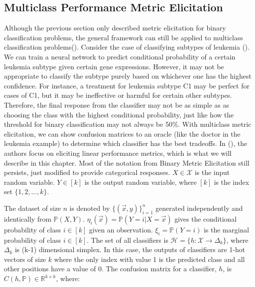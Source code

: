 \documentclass[
  letterpaper,
  numbers=noenddot,
  DIV=11]{scrreprt}
\theoremstyle{plain}
\theoremstyle{definition}
\theoremstyle{remark}
\begin{document}
\subsection{Multiclass Performance Metric
Elicitation}\label{multiclass-performance-metric-elicitation}

Although the previous section only described metric elicitation for
binary classification problems, the general framework can still be
applied to multiclass classification
problems().
Consider the case of classifying subtypes of leukemia
(). We can
train a neural network to predict conditional probability of a certain
leukemia subtype given certain gene expressions. However, it may not be
appropriate to classify the subtype purely based on whichever one has
the highest confidence. For instance, a treatment for leukemia subtype
C1 may be perfect for cases of C1, but it may be ineffective or harmful
for certain other subtypes. Therefore, the final response from the
classifier may not be as simple as as choosing the class with the
highest conditional probability, just like how the threshold for binary
classification may not always be 50\%. With multiclass metric
elicitation, we can show confusion matrices to an oracle (like the
doctor in the leukemia example) to determine which classifier has the
best tradeoffs. In (), the authors focus on eliciting linear performance metrics,
which is what we will describe in this chapter. Most of the notation
from Binary Metric Elicitation still persists, just modified to provide
categorical responses. \(X \in \mathcal{X}\) is the input random
variable. \(Y \in [k]\) is the output random variable, where \([k]\) is
the index set \(\{1, 2, \dots, k\}\).

The dataset of size \(n\) is denoted by \(\{(\vec{x}, y)\}_{i=1}^n\)
generated independently and identically from \(\mathbb{P}(X, Y)\).
\(\eta_i(\vec{x}) = \mathbb{P}(Y=i | X=\vec{x})\) gives the conditional
probability of class \(i \in [k]\) given an observation.
\(\xi_i = \mathbb{P}(Y=i)\) is the marginal probability of class
\(i \in [k]\). The set of all classifiers is
\(\mathcal{H} = \{h : \mathcal{X} \rightarrow \Delta_k\}\), where
\(\Delta_k\) is (k-1) dimensional simplex. In this case, the outputs of
classifiers are 1-hot vectors of size \(k\) where the only index with
value 1 is the predicted class and all other positions have a value of
0. The confusion matrix for a classifier, \(h\), is
\(C(h, \mathbb{P}) \in \mathbb{R}^{k \times k}\), where:
\end{document}
